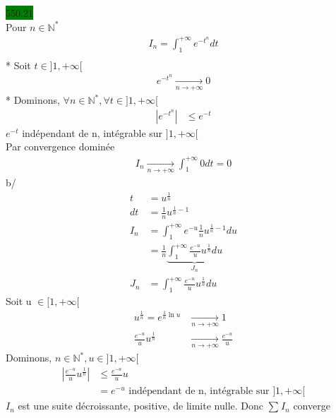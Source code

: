 \documentclass{article}
\begin{document}
\noindent \colorbox{green}{550.21}\\ 
Pour \(n \in \mathbb{N}^{*}\)
\begin{align*}
    I_{n}= \int_{1}^{+\infty} e^{-t^{n}}dt \\ 
\end{align*}
* Soit \(t \in ]1, +\infty[\)
\begin{align*}
  e^{-t^{n}} \xrightarrow[n \to +\infty]{} 0 
\end{align*}
* Dominons, \(\forall n \in \mathbb{N}^{*}, \forall t \in ]1, +\infty[\)
\begin{align*}
  |e^{-t^{n}}| &\leq e^{-t}
\end{align*}
\(e^{-t}\) indépendant de n, intégrable sur \(]1, +\infty[\)\\
Par convergence dominée
\begin{align*}
  I_{n} \xrightarrow[n \to +\infty]{} \int_{1}^{+\infty} 0 dt = 0
\end{align*}
b/ 
\begin{align*}
  t &= u^{\frac{1}{n}}\\ 
  dt &= \frac{1}{n}u^{\frac{1}{n}-1}\\
  I_{n}&=\int_{1}^{+\infty} e^{-u }\frac{1}{n}u^{\frac{1}{n}-1}du \\
       &= \frac{1}{n}\underbrace{\int_{1}^{+\infty} \frac{e^{-u }}{u}u^{\frac{1}{n}}du}_{J_{n}}\\ 
  J_{n}&= \int_{1}^{+\infty}\frac{e^{-u }}{u}u^{\frac{1}{n}} du 
\end{align*}
Soit u \(\in [1, +\infty[\)\\ 
\begin{align*}
  u^{\frac{1}{n}} = e^{\frac{1}{n}\ln u} &\xrightarrow[n\to +\infty]{} 1 \\ 
  \frac{e^{-u }}{u}u^{\frac{1}{n}} &\xrightarrow[n \to +\infty]{} \frac{e^{-u }}{u}
\end{align*}
Dominons, \(n \in \mathbb{N}^{*}, u \in ]1, +\infty[\)
\begin{align*}
  |\frac{e^{-u }}{u}u^{\frac{1}{n}}| &\leq \frac{e^{-u }}{u} u \\ 
                                     &= e^{-u } \text{ indépendant de n, intégrable sur } ]1, +\infty[
\end{align*}
\(I_{n}\) est une suite décroissante, positive, de limite nulle. 
Donc \(\sum_{}^{} I_{n}\) converge \\
\end{document}
